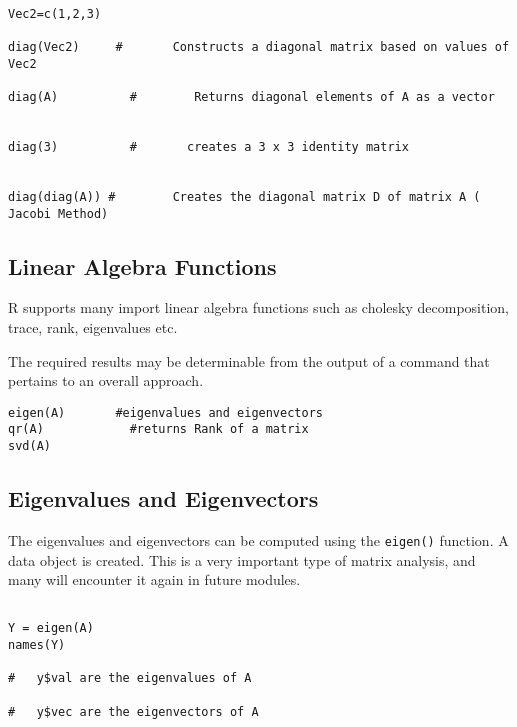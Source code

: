 \begin{framed}
\begin{verbatim}

Vec2=c(1,2,3)

diag(Vec2)     #       Constructs a diagonal matrix based on values of Vec2

diag(A)          #        Returns diagonal elements of A as a vector


diag(3)          #       creates a 3 x 3 identity matrix


diag(diag(A)) #        Creates the diagonal matrix D of matrix A ( Jacobi Method)

\end{verbatim}
\end{framed}
\subsection{Linear Algebra Functions}


R supports many import linear algebra functions such as cholesky decomposition, trace, rank, eigenvalues etc.


The required results may be determinable from the output of a command that pertains to an overall approach.

\begin{framed}
\begin{verbatim}
eigen(A)       #eigenvalues and eigenvectors       
qr(A)            #returns Rank of a matrix
svd(A)
\end{verbatim}
\end{framed}
\subsection{Eigenvalues and Eigenvectors}
The eigenvalues and eigenvectors can be computed using the \texttt{eigen()} function.  A data object is created.
This is a very important type of matrix analysis, and many will encounter it again in future modules.

\begin{framed}
\begin{verbatim}

Y = eigen(A)
names(Y)

#   y$val are the eigenvalues of A

#   y$vec are the eigenvectors of A 

\end{verbatim}
\end{framed}
 




